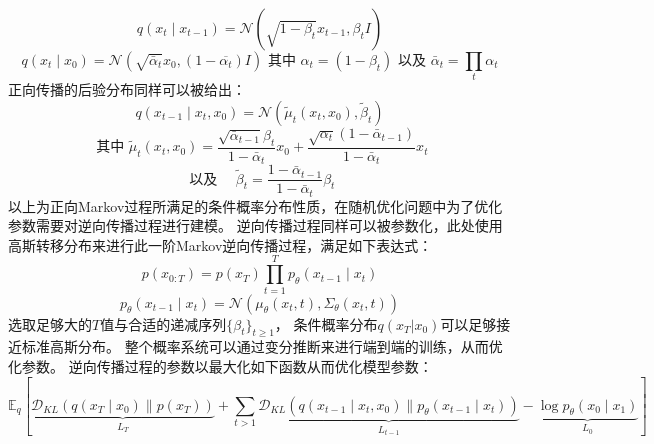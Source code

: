     \begin{equation}
        q\left(x_t \mid x_{t-1}\right)=\mathcal{N}\left(\sqrt{1-\beta_t} x_{t-1}, \beta_t I\right)
        \end{equation}
        \begin{equation}
            q\left(x_t \mid x_0\right)=\mathcal{N}\left(\sqrt{\bar{\alpha}_t} x_0,\left(1-\overline{\alpha_t}\right) I\right) \text { 其中 } \alpha_t=\left(1-\beta_t\right) \text { 以及 } \bar{\alpha}_t=\prod_t \alpha_t
            \end{equation}
    正向传播的后验分布同样可以被给出：
    \begin{equation}
        q\left(x_{t-1} \mid x_t, x_0\right)=\mathcal{N}\left(\tilde{\mu}_t\left(x_t, x_0\right), \tilde{\beta}_t\right)
        \end{equation}
        \begin{equation}
            \text {     其中 } \tilde{\mu}_t\left(x_t, x_0\right)=\frac{\sqrt{\bar{\alpha}_{t-1}} \beta_t}{1-\bar{\alpha}_t} x_0+\frac{\sqrt{\alpha_t}\left(1-\bar{\alpha}_{t-1}\right)}{1-\bar{\alpha}_t} x_t
            \end{equation}
            \begin{equation}
                \text { 以及 } \quad \tilde{\beta}_t=\frac{1-\bar{\alpha}_{t-1}}{1-\bar{\alpha}_t} \beta_t
                \end{equation}
以上为正向Markov过程所满足的条件概率分布性质，在随机优化问题中为了优化参数需要对逆向传播过程进行建模。
逆向传播过程同样可以被参数化，此处使用高斯转移分布来进行此一阶Markov逆向传播过程，满足如下表达式：
\begin{equation}
    p\left(x_{0: T}\right)=p\left(x_T\right) \prod_{t=1}^T p_\theta\left(x_{t-1} \mid x_t\right)
    \end{equation}
    \begin{equation}
        p_\theta\left(x_{t-1} \mid x_t\right)=\mathcal{N}\left(\mu_\theta\left(x_t, t\right), \Sigma_\theta\left(x_t, t\right)\right)
        \end{equation}
选取足够大的$T$值与合适的递减序列$\{\beta_t\}_{t\geq 1}$， 条件概率分布$q(x_{T}|x_0)$可以足够接近标准高斯分布。
整个概率系统可以通过变分推断来进行端到端的训练，从而优化参数。
逆向传播过程的参数以最大化如下函数从而优化模型参数：
\begin{equation}
    \mathbb{E}_q[\underbrace{\mathcal{D}_{K L}\left(q\left(x_T \mid x_0\right) \| p\left(x_T\right)\right)}_{L_T}+\sum_{t>1} \underbrace{\mathcal{D}_{K L}\left(q\left(x_{t-1} \mid x_t, x_0\right) \| p_\theta\left(x_{t-1} \mid x_t\right)\right)}_{L_{t-1}}-\underbrace{\log p_\theta\left(x_0 \mid x_1\right)}_{L_0}]
    \end{equation}